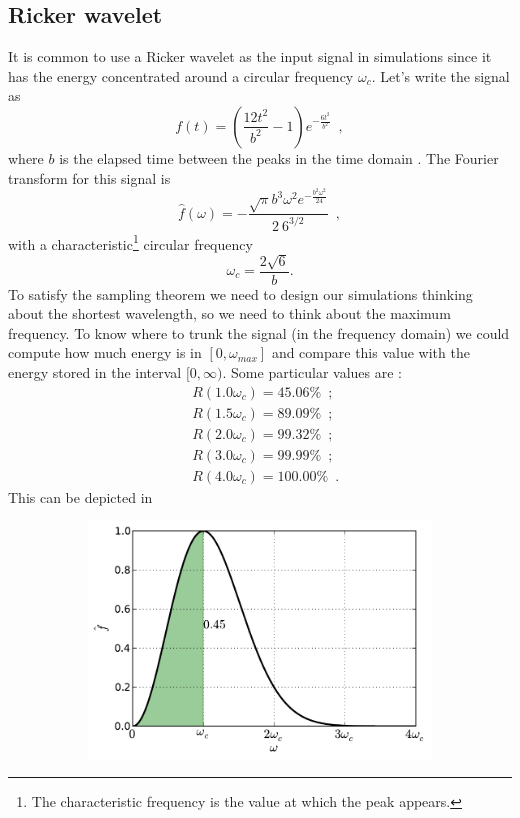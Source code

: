 \documentclass[12pt,letterpaper,landscape]{article}
\begin{document}
{\subsection{Ricker wavelet}
It is common to use a Ricker wavelet as the input signal in simulations since it has the energy concentrated around a circular frequency $\omega_{c}$. Let's write the signal as 
\[f(t)=\left(\frac{12t^{2}}{b^{2}}-1\right)e^{-\frac{6t^{2}}{b^{2}}}\enspace,\]
 where $b$ is the elapsed time between the peaks in the time domain \cite{Papageorgiou91}. The Fourier transform for this signal is  
\[\hat{f}(\omega)=-\frac{\sqrt{\pi}b^{3}\omega^{2}e^{-\frac{b^{2}\omega^{2}}{24}}}{2\ 6^{3/2}}\enspace, \]
with a characteristic\footnote{The characteristic frequency is the value at which the peak appears.} circular frequency 
\[\omega_{c}=\frac{2\sqrt{6}}{b}. \]
To satisfy the sampling theorem we need to design our simulations
thinking about the shortest wavelength, so we need to think about
the maximum frequency. To know where to trunk the signal (in the frequency domain) we could compute how much energy is in $[0,\omega_{max}]$ and compare this value with the energy stored in the interval $[0,\infty)$. Some particular values are : 
\begin{align*}
 & R(1.0\omega_{c})=45.06\%\enspace;\\
 & R(1.5\omega_{c})=89.09\%\enspace;\\
 & R(2.0\omega_{c})=99.32\%\enspace;\\
 & R(3.0\omega_{c})=99.99\%\enspace;\\
 & R(4.0\omega_{c})=100.00\%\enspace.
\end{align*}
This can be depicted in
\begin{figure}[h]
    \centering
    \begin{subfigure}[b]{0.45\textwidth}
        \includegraphics[width=\textwidth]{img/ricker_area=1.pdf}

\end{subfigure}
\end{figure}}
\end{document}

